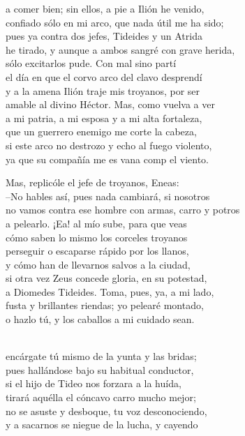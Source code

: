 a comer bien; sin ellos, a pie a Ilión he venido,\\
confiado sólo en mi arco, que nada útil me ha sido;\\
pues ya contra dos jefes, Tideides y un Atrida\\
he tirado, y aunque a ambos sangré con grave herida,\\
sólo excitarlos pude. Con mal sino partí\\
el día en que el corvo arco del clavo desprendí\\
y a la amena Ilión traje mis troyanos, por ser\\
amable al divino Héctor. Mas, como vuelva a ver\\
a mi patria, a mi esposa y a mi alta fortaleza,\\
que un guerrero enemigo me corte la cabeza,\\
si este arco no destrozo y echo al fuego violento,\\
ya que su compañía me es vana comp el viento.\par
Mas, replicóle el jefe de troyanos, Eneas:\\
--No hables así, pues nada cambiará, si nosotros\\
no vamos contra ese hombre con armas, carro y potros\\
a pelearlo. ¡Ea! al mío sube, para que veas\\
cómo saben lo mismo los corceles troyanos\\
perseguir o escaparse rápido por los llanos,\\
y cómo han de llevarnos salvos a la ciudad,\\
si otra vez Zeus concede gloria, en su potestad,\\
a Diomedes Tideides. Toma, pues, ya, a mi lado,\\
fusta y brillantes riendas; yo pelearé montado,\\
o hazlo tú, y los caballos a mi cuidado sean.\par
{}\\
encárgate tú mismo de la yunta y las bridas;\\
pues hallándose bajo su habitual conductor,\\
si el hijo de Tideo nos forzara a la huída,\\
tirará aquélla el cóncavo carro mucho mejor;\\
no se asuste y desboque, tu voz desconociendo,\\
y a sacarnos se niegue de la lucha, y cayendo\\
